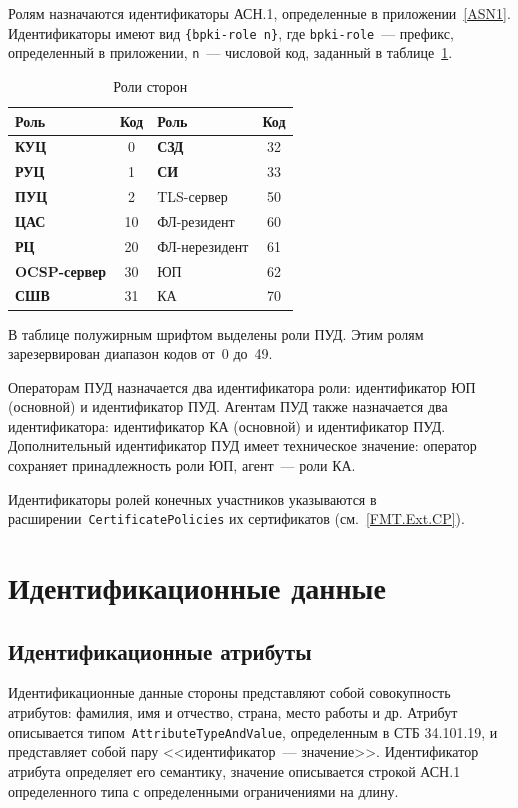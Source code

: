 Ролям назначаются идентификаторы АСН.1, определенные в приложении~\ref{ASN1}. 
Идентификаторы имеют вид \verb|{bpki-role n}|,
где \verb|bpki-role|~--- префикс, определенный в приложении,
\texttt{n}~--- числовой код, заданный в таблице~\ref{Table.ENTITIES.Roles}.

\begin{table}[bht]
\caption{Роли сторон}
\label{Table.ENTITIES.Roles}
\begin{tabular}{|l|c||l|c|}
\hline
Роль & Код & Роль & Код\\
\hline
\hline
{\bf КУЦ}        & 0    & {\bf СЗД}      & 32 \\
{\bf РУЦ}        & 1    & {\bf СИ}       & 33 \\
{\bf ПУЦ}        & 2    & TLS-сервер     & 50 \\
{\bf ЦАС}        & 10   & ФЛ-резидент    & 60 \\
{\bf РЦ}         & 20   & ФЛ-нерезидент  & 61 \\
{\bf OCSP-сервер}& 30   & ЮП             & 62 \\
{\bf СШВ}        & 31   & КА             & 70 \\
\hline
\end{tabular}
\end{table}

В таблице полужирным шрифтом выделены роли ПУД.
Этим ролям зарезервирован диапазон кодов от~0 до~49.

Операторам ПУД назначается два идентификатора роли: 
идентификатор ЮП (основной) и идентификатор ПУД. 
%
Агентам ПУД также назначается два идентификатора: 
идентификатор КА (основной) и идентификатор ПУД. 
%
Дополнительный идентификатор ПУД имеет техническое значение:
оператор сохраняет принадлежность роли ЮП, агент~--- 
роли КА.

Идентификаторы ролей конечных участников указываются в 
расширении~\texttt{CertificatePolicies} их сертификатов
(см.~\ref{FMT.Ext.CP}).

\section{Идентификационные данные}\label{ENTITIES.Name}

\subsection{Идентификационные атрибуты}\label{ENTITIES.Attrs}

Идентификационные данные стороны представляют собой совокупность атрибутов: 
фамилия, имя и отчество, страна, место работы и др.  
%
Атрибут описывается типом~\texttt{AttributeTypeAndValue}, определенным в 
СТБ 34.101.19, и представляет собой пару <<идентификатор~--- значение>>. 
Идентификатор атрибута определяет его семантику, 
значение описывается строкой АСН.1 определенного типа с определенными 
ограничениями на длину.  

